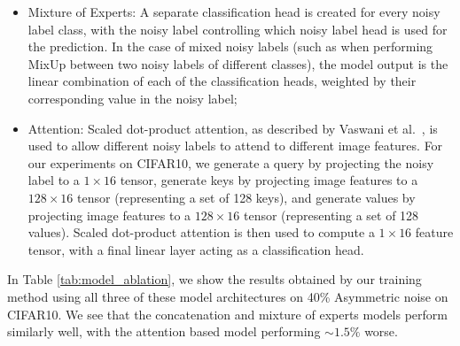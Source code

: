\documentclass[10pt,twocolumn,letterpaper]{article}
\begin{document}
\begin{itemize}
    \item Mixture of Experts: A separate classification head is created for every noisy label class, with the noisy label controlling which noisy label head is used for the prediction. In the case of mixed noisy labels (such as when performing MixUp between two noisy labels of different classes), the model output is the linear combination of each of the classification heads, weighted by their corresponding value in the noisy label;
    \item Attention: Scaled dot-product attention, as described by Vaswani et al.~\cite{vaswani2017attention}, is used to allow different noisy labels to attend to different image features. For our experiments on CIFAR10, we generate a query by projecting the noisy label to a $1 \times 16$ tensor, generate keys by projecting image features to a $128 \times 16$ tensor (representing a set of 128 keys), and generate values by projecting image features to a $128 \times 16$ tensor (representing a set of 128 values). Scaled dot-product attention is then used to compute a $1 \times 16$ feature tensor, with a final linear layer acting as a classification head.
\end{itemize}

In Table \ref{tab:model_ablation}, we show the results obtained by our training method using all three of these model architectures on 40\% Asymmetric noise on CIFAR10. We see that the concatenation and mixture of experts models perform similarly well, with the attention based model performing $\sim 1.5\%$ worse.

\begin{table}[ht!]
    \begin{center}
    \end{center}
    \caption{\small Accuracy using different model constructions for Asym. 40\% noise on CIFAR10} 
    \label{tab:model_ablation}
\end{table}
\end{document}
